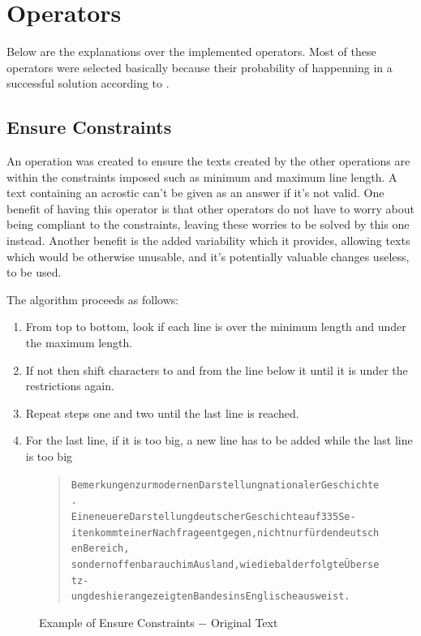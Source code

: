 \documentclass[11pt]{reportAlternative}
\begin{document}
\section{Operators}
Below are the explanations over the implemented operators. Most of these operators were selected basically because their probability of happenning in a successful solution according to \cite[p.~2025]{Stein}.

\subsection{Ensure Constraints}
An operation was created to ensure the texts created by the other operations are within the constraints imposed such as minimum and maximum line length. A text containing an acrostic can't be given as an answer if it's not valid. One benefit of having this operator is that other operators do not have to worry about being compliant to the constraints, leaving these worries to be solved by this one instead. Another benefit is the added variability which it provides, allowing texts which would be otherwise unusable, and it's potentially valuable changes useless, to be used.

The algorithm proceeds as follows:
\begin{enumerate}
\item From top to bottom, look if each line is over the minimum length and under the maximum length.
\item If not then shift characters to and from the line below it until it is under the restrictions again.
\item Repeat steps one and two until the last line is reached.
\item For the last line, if it is too big, a new line has to be added while the last line is too big
\end{enumerate}

\begin{figure}[H]
	\begin{quote}
		\begin{alltt}
Bemerkungen zur modernen Darstellung nationaler Geschichte.
Eine neuere Darstellung deutscher Geschichte auf 335 Se-
iten kommt einer Nachfrage entgegen, nicht nur für den deutschen Bereich,
sondern offenbar auch im Ausland, wie die bald erfolgte Übersetz-
ung des hier angezeigten Bandes ins Englische ausweist.
		\end{alltt}
	\end{quote}
	\caption{Example of Ensure Constraints $-$ Original Text}
\end{figure}
\end{document}
